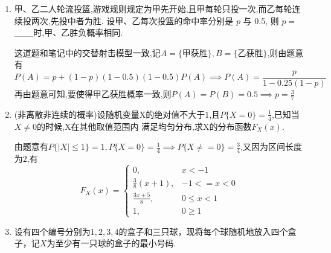 \documentclass[12pt, a4paper, oneside, UTF8]{ctexbook}
\begin{document}
\begin{enumerate}
\begin{solution}
\begin{align*}
        &=\frac{(\lambda p)^k}{k!}e^{-\lambda p}\sum_{n=k}^{\infty}\frac{(\lambda p)^{n-k}}{(n-k)!}e^{-\lambda p} \\
        &\xlongequal{\text{Possion分布}}\frac{(\lambda p)^k}{k!}e^{-\lambda p}
        \end{align*}
        (2)当$m<k$的时候,$P(A_m\mid B_k)=0$,当$m\geq k$,
        \begin{align*}
            P(A_m\mid B_k) &=\frac{P(A_m)P(B_k\mid A_m)}{P(B_k)} \\
            &= \frac{(\lambda q)^{m-k}}{(m-k)!}e^{-\lambda q}, m\in (k,k+1,\ldots)
        \end{align*}
    \end{solution}
    \begin{tcolorbox}[title=总结]
        关于全概率公式与贝叶斯公式的总结 \\
        这种问题的关键在于寻找一个合适的完备事件组,当问题涉及"原因推结果/结果推原因"大概率要用贝叶斯公式(条件概率是贝叶斯的特殊情况)
    \end{tcolorbox}
    \item 甲、乙二人轮流投篮,游戏规则规定为甲先开始,且甲每轮只投一次,而乙每轮连续投两次,先投中者为胜. 设甲、乙每次投篮的命中率分别是 $p$ 与 0.5,
    则 $p =$\_\_\_时,甲、乙胜负概率相同.
    \begin{solution}
        这道题和笔记中的交替射击模型一致,记$A=\{\text{甲获胜}\},B=\{\text{乙获胜}\}$,则由题意有 
        \[
        P(A)=p+(1-p)(1-0.5)(1-0.5)P(A)\implies P(A)=\frac{p}{1-0.25(1-p)}
        \]
        再由题意可知,要使得甲乙获胜概率一致,则$P(A)=P(B)=0.5\implies p = \frac{3}{7}$
    \end{solution}
    \item (非离散非连续的概率)设随机变量X的绝对值不大于1,且$P\{X=0\}=\frac{1}{4}$,已知当$X\neq 0$的时候,X在其他取值范围内
    满足均匀分布,求X的分布函数$F_{X}(x)$.
    \begin{solution}
        由题意有$P\{|X|\leq 1\}=1,P\{X=0\}=\frac{1}{4}\implies P\{X\neq = 0\}=\frac{3}{4}$,又因为区间长度为$2$,有
        \[F_{X}(x) =
        \begin{cases}
            0, & x < -1 \\
            \frac{3}{8}(x+1), & -1 <= x < 0 \\
            \frac{3x+5}{8}, & 0\leq x < 1 \\
            1, & 0 \geq 1
        \end{cases}
        \]
    \end{solution}
    \item 设有四个编号分别为$1,2,3,4$的盒子和三只球，现将每个球随机地放入四个盒子，记$X$为至少有一只球的盒子的最小号码.

\end{enumerate}
\end{document}
